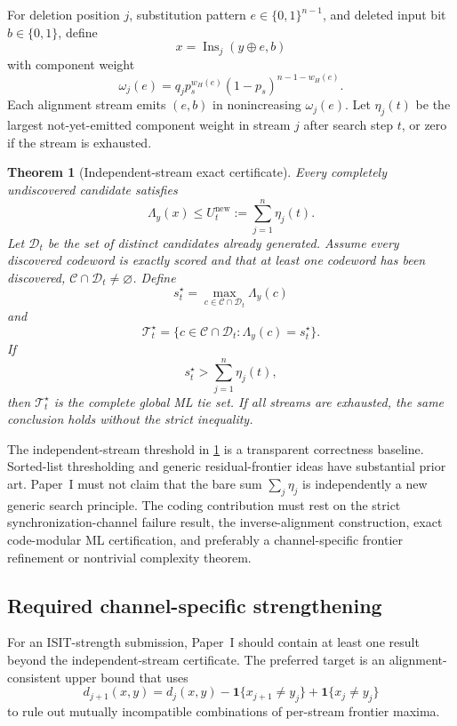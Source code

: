 \documentclass[11pt]{article}
\newtheorem{theorem}{Theorem}[section]
\theoremstyle{definition}
\theoremstyle{remark}
\newcommand{\C}{\mathcal{C}}
\newcommand{\D}{\mathcal{D}}
\newcommand{\ind}{\mathbf{1}}
\newcommand{\Ins}{\operatorname{Ins}}
\begin{document}
For deletion position $j$, substitution pattern $e\in\{0,1\}^{n-1}$, and deleted input bit $b\in\{0,1\}$, define
\[
x=\Ins_j(y\oplus e,b)
\]
with component weight
\[
\omega_j(e)=q_jp_s^{w_H(e)}(1-p_s)^{n-1-w_H(e)}.
\]
Each alignment stream emits $(e,b)$ in nonincreasing $\omega_j(e)$. Let $\eta_j(t)$ be the largest not-yet-emitted component weight in stream $j$ after search step $t$, or zero if the stream is exhausted.

\begin{theorem}[Independent-stream exact certificate]
\label{thm:certificate}
Every completely undiscovered candidate satisfies
\[
\Lambda_y(x)\le U_t^{\mathrm{new}}:=\sum_{j=1}^{n}\eta_j(t).
\]
Let $\D_t$ be the set of distinct candidates already generated. Assume every discovered codeword is exactly scored and that at least one codeword has been discovered, $\C\cap\D_t\ne\varnothing$. Define
\[
s_t^\star=\max_{c\in\C\cap\D_t}\Lambda_y(c)
\]
and
\[
\mathcal T_t^\star=
\{c\in\C\cap\D_t:\Lambda_y(c)=s_t^\star\}.
\]
If
\[
s_t^\star>\sum_{j=1}^{n}\eta_j(t),
\]
then $\mathcal T_t^\star$ is the complete global ML tie set. If all streams are exhausted, the same conclusion holds without the strict inequality.
\end{theorem}

\begin{riskbox}
The independent-stream threshold in \cref{thm:certificate} is a transparent correctness baseline. Sorted-list thresholding and generic residual-frontier ideas have substantial prior art. Paper~I must not claim that the bare sum $\sum_j\eta_j$ is independently a new generic search principle. The coding contribution must rest on the strict synchronization-channel failure result, the inverse-alignment construction, exact code-modular ML certification, and preferably a channel-specific frontier refinement or nontrivial complexity theorem.
\end{riskbox}

\subsection{Required channel-specific strengthening}
\label{sec:strengthen}

For an ISIT-strength submission, Paper~I should contain at least one result beyond the independent-stream certificate. The preferred target is an alignment-consistent upper bound that uses
\[
 d_{j+1}(x,y)=d_j(x,y)
 -\ind\{x_{j+1}\ne y_j\}
 +\ind\{x_j\ne y_j\}
\]
to rule out mutually incompatible combinations of per-stream frontier maxima.
\end{document}
